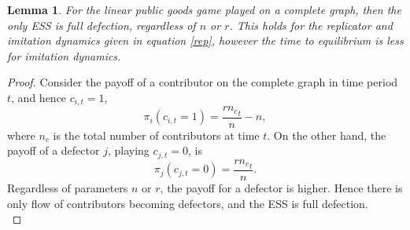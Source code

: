 \newtheorem{lemma_connected}[theorem]{Lemma} 
\begin{lemma_connected}
For the linear public goods game played on a complete graph, then the only ESS is full defection, regardless of $n$ or $r$. This holds for the replicator and imitation dynamics given in equation \eqref{rep}, however the time to equilibrium is less for imitation dynamics.  \end{lemma_connected} \label{connected}
\begin{proof}
Consider the payoff of a contributor on the complete graph in time period $t$, and hence $c_{i,t} = 1$, $$\pi_i(c_{i,t} = 1) = \frac{r {n_c}_t}{n} - n,  $$ where $n_c$ is the total number of contributors at time $t$. On the other hand, the payoff of a defector $j$, playing $c_{j,t} = 0$, is $$\pi_j(c_{j,t} = 0) = \frac{r {n_c}_t}{n}. $$ Regardless of parameters $n$ or $r$, the payoff for a defector is higher. Hence there is only flow of contributors becoming defectors, and the ESS is full defection. \\


\end{proof}
